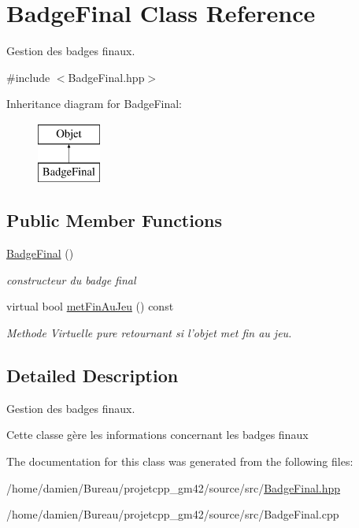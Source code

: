 \hypertarget{classBadgeFinal}{\section{Badge\-Final Class Reference}
\label{classBadgeFinal}
}


Gestion des badges finaux.  




{\ttfamily \#include $<$Badge\-Final.\-hpp$>$}

Inheritance diagram for Badge\-Final\-:\begin{figure}[H]
\begin{center}
\leavevmode
\includegraphics[height=2.000000cm]{classBadgeFinal}
\end{center}
\end{figure}
\subsection*{Public Member Functions}
\begin{DoxyCompactItemize}
\item 
\hypertarget{classBadgeFinal_a96c7204b62fea66c12d4dd3fe9bd0efb}{\hyperlink{classBadgeFinal_a96c7204b62fea66c12d4dd3fe9bd0efb}{Badge\-Final} ()}\label{classBadgeFinal_a96c7204b62fea66c12d4dd3fe9bd0efb}

\begin{DoxyCompactList}\small\item\em constructeur du badge final \end{DoxyCompactList}\item 
\hypertarget{classBadgeFinal_a257a6c9b681399ba8e5f7ae8ec065cc6}{virtual bool \hyperlink{classBadgeFinal_a257a6c9b681399ba8e5f7ae8ec065cc6}{met\-Fin\-Au\-Jeu} () const }\label{classBadgeFinal_a257a6c9b681399ba8e5f7ae8ec065cc6}

\begin{DoxyCompactList}\small\item\em Methode Virtuelle pure retournant si l'objet met fin au jeu. \end{DoxyCompactList}\end{DoxyCompactItemize}


\subsection{Detailed Description}
Gestion des badges finaux. 

Cette classe gère les informations concernant les badges finaux 

The documentation for this class was generated from the following files\-:\begin{DoxyCompactItemize}
\item 
/home/damien/\-Bureau/projetcpp\-\_\-gm42/source/src/\hyperlink{BadgeFinal_8hpp}{Badge\-Final.\-hpp}\item 
/home/damien/\-Bureau/projetcpp\-\_\-gm42/source/src/Badge\-Final.\-cpp\end{DoxyCompactItemize}
